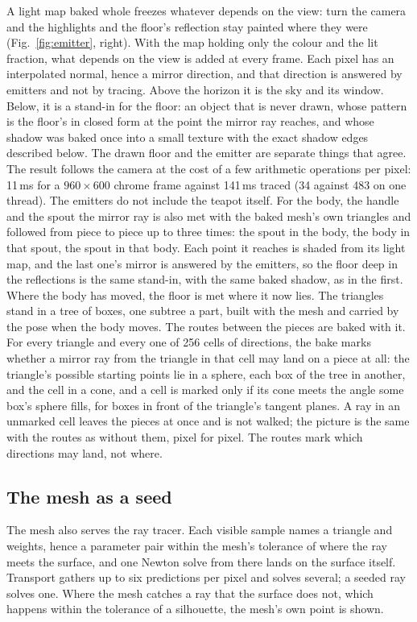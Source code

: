 \documentclass[journal]{IEEEtran}
\begin{document}
A light map baked whole freezes whatever depends on the view: turn the
camera and the highlights and the floor's reflection stay painted where
they were (Fig.~\ref{fig:emitter}, right). With the map holding only
the colour and the lit fraction, what depends on the view is added at
every frame. Each pixel has an interpolated normal,
hence a mirror direction, and that direction is answered by emitters and
not by tracing. Above the horizon it is the sky and its window. Below,
it is a stand-in for the floor: an object that is never drawn, whose
pattern is the floor's in closed form at the point the mirror ray
reaches, and whose shadow was baked once into a small texture with the
exact shadow edges described below. The drawn floor and the
emitter are separate things that agree. The result follows the camera
at the cost of a few arithmetic operations per pixel: 11\,ms for a
$960\times600$ chrome frame against 141\,ms traced (34 against 483 on
one thread). The
emitters do not include the teapot itself. For the body, the handle and
the spout the mirror ray is also met with the baked mesh's own triangles and followed from piece to
piece up to three times: the spout in the body, the body in that spout,
the spout in that body. Each point it reaches is shaded from its light
map, and the last one's mirror is answered by the emitters, so the
floor deep in the reflections is the same stand-in, with the same baked
shadow, as in the first. Where the body has moved, the floor is met
where it now lies. The triangles stand in a tree of boxes, one subtree a
part, built with the mesh and carried by the pose when the body moves.
The routes between the pieces are baked with it. For every triangle and
every one of 256 cells of directions, the bake marks whether a mirror
ray from the triangle in that cell may land on a piece at all: the
triangle's possible starting points lie in a sphere, each box of the
tree in another, and the cell in a cone, and a cell is marked only if
its cone meets the angle some box's sphere fills, for boxes in front of
the triangle's tangent planes. A ray in an unmarked cell leaves the
pieces at once and is not walked; the picture is the same with the
routes as without them, pixel for pixel. The routes mark which
directions may land, not where.

\subsection{The mesh as a seed}

The mesh also serves the ray tracer. Each visible sample names a
triangle and weights, hence a parameter pair within the mesh's tolerance
of where the ray meets the surface, and one Newton solve from there
lands on the surface itself. Transport gathers up to six predictions per
pixel and solves several; a seeded ray solves one. Where the mesh
catches a ray that the surface does not, which happens within the
tolerance of a silhouette, the mesh's own point is shown.
\end{document}
